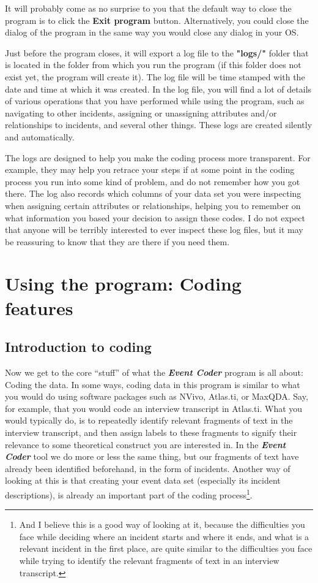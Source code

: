 \documentclass{memoir}
\begin{document}
It will probably come as no surprise to you that the default way to close the program is to click the \textbf{Exit program} button. Alternatively, you could close the dialog of the program in the same way you would close any dialog in your OS.

Just before the program closes, it will export a log file to the \textbf{"logs/"} folder that is located in the folder from which you run the program (if this folder does not exist yet, the program will create it). The log file will be time stamped with the date and time at which it was created. In the log file, you will find a lot of details of various operations that you have performed while using the program, such as navigating to other incidents, assigning or unassigning attributes and/or relationships to incidents, and several other things. These logs are created silently and automatically.

The logs are designed to help you make the coding process more transparent. For example, they may help you retrace your steps if at some point in the coding process you run into some kind of problem, and do not remember how you got there. The log also records which columns of your data set you were inspecting when assigning certain attributes or relationships, helping you to remember on what information you based your decision to assign these codes. I do not expect that anyone will be terribly interested to ever inspect these log files, but it may be reassuring to know that they are there if you need them.  


\chapter{Using the program: Coding features}
\label{chap:usingtheprogram2}

\section{Introduction to coding}
\label{sec:introductiontocoding}

Now we get to the core ``stuff'' of what the \textbf{\emph{Event Coder}} program is all about: Coding the data. In some ways, coding data in this program is similar to what you would do using software packages such as NVivo, Atlas.ti, or MaxQDA. Say, for example, that you would code an interview transcript in Atlas.ti. What you would typically do, is to repeatedly identify relevant fragments of text in the interview transcript, and then assign labels to these fragments to signify their relevance to some theoretical construct you are interested in. In the \textbf{\emph{Event Coder}} tool we do more or less the same thing, but our fragments of text have already been identified beforehand, in the form of incidents. Another way of looking at this is that creating your event data set (especially its incident descriptions), is already an important part of the coding process\footnote{And I believe this is a good way of looking at it, because the difficulties you face while deciding where an incident starts and where it ends, and what is a relevant incident in the first place, are quite similar to the difficulties you face while trying to identify the relevant fragments of text in an interview transcript.}. 
\end{document}
